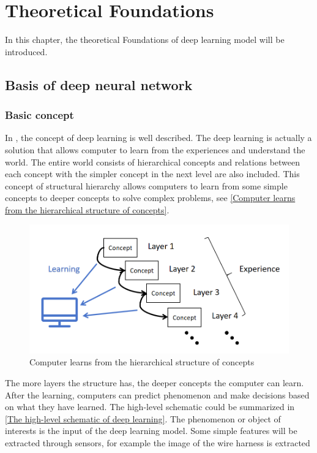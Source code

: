 \chapter{Theoretical Foundations}
In this chapter, the theoretical Foundations of deep learning model will be introduced. 
\section{Basis of deep neural network}
\subsection{Basic concept}
    In \cite{Goodfellow-et-al-2016}, the concept of deep learning is well described. The deep learning is actually a solution that allows 
    computer to learn from the experiences and understand the world. The entire world consists of hierarchical concepts and relations between 
    each concept with the simpler concept in the next level are also included. This concept of structural hierarchy allows computers to learn 
    from some simple concepts to deeper concepts to solve complex problems, see \autoref{Computer learns from the hierarchical structure of concepts}.
    \begin{figure}
		\centering
		\includegraphics[width=0.9\linewidth]{example_images/ConceptDL}
		\caption{Computer learns from the hierarchical structure of concepts}
		\label{Computer learns from the hierarchical structure of concepts}
	  \end{figure}
    The more layers the structure has, the deeper concepts the computer can learn. After the learning, computers can predict phenomenon and make decisions 
    based on what they have learned. The high-level schematic could be summarized in \autoref{The high-level schematic of deep learning}. The phenomenon or object 
    of interests is the input of the deep learning model. Some simple features will be extracted through sensors, for example the image of the wire harness is extracted 
